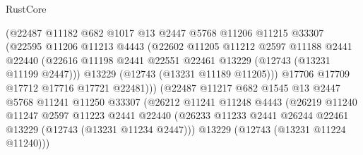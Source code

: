 \begin{lexlean}{RustCore}
\begin{coremodule}
                            (@22487
                              @11182
                              @682
                              @1017
                              @13
                              @2447
                              @5768
                              @11206
                              @11215
                              @33307
                              (@22595
                                @11206
                                @11213
                                @4443
                                (@22602
                                  @11205
                                  @11212
                                  @2597
                                  @11188
                                  @2441
                                  @22440
                                  (@22616
                                    @11198
                                    @2441
                                    @22551
                                    @22461
                                    @13229
                                    (@12743 (@13231 @11199 @2447)))
                                  @13229
                                  (@12743 (@13231 @11189 @11205)))
                                @17706
                                @17709
                                @17712
                                @17716
                                @17721
                                @22481)))
                          (@22487
                            @11217
                            @682
                            @1545
                            @13
                            @2447
                            @5768
                            @11241
                            @11250
                            @33307
                            (@26212
                              @11241
                              @11248
                              @4443
                              (@26219
                                @11240
                                @11247
                                @2597
                                @11223
                                @2441
                                @22440
                                (@26233
                                  @11233
                                  @2441
                                  @26244
                                  @22461
                                  @13229
                                  (@12743 (@13231 @11234 @2447)))
                                @13229
                                (@12743 (@13231 @11224 @11240)))

\end{coremodule}
\end{lexlean}
